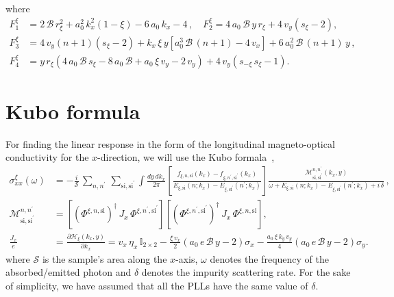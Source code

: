 \documentclass[aps,prb, onecolumn,nofootinbib,citeautoscript,10pt]{revtex4-2}
\def \nn{\nonumber \\}
\begin{document}
where
\begin{align}
F_1^\xi  &=  2 \, \mathcal{B}  \, r_\xi^2 + a_0^2 \,  k_x^2 \left (1 - \xi \right )
-6 \, a_0  \, k_x - 4\,, \quad
F_2^\xi  = 4 \, a_0 \, \mathcal{B} \, y  \, r_\xi + 4 \, v_y\left (s_\xi-2 \right ), \nn
F_3^\xi  &= 4\,v_y \left (n+1 \right ) \left (s_\xi-2 \right ) 
+k_x  \,  \xi \,y \left[ a_0^3  \, \mathcal{B}\,(n+1)-4 \, v_x\right]
+6 \, a_0^2 \, \mathcal{B}\,(n+1)\,y\,, \nn
F_4^\xi  & = y\, r_\xi \left(4 \,a_0\,\mathcal{B}\,s_\xi-8\,a_0 \, \mathcal{B}
+ a_0 \,\xi\, v_y-2\, v_y \right)
+ 4\,v_y\left(s_{-\xi} \, s_\xi-1\right).
\end{align}

\section{Kubo formula}

For finding the linear response in the form of the longitudinal magneto-optical conductivity for the $x$-direction, we will use
the Kubo formala~\cite{ashby-carbotte},
\begin{align}
\label{eqkubo}
\sigma^\xi_{xx}(\omega) &= -\frac{i} {\mathcal S} \, \sum_{n,n^\prime} \, \sum_{\text{si},\text{si}^\prime}
\int \frac{dy\, dk_x}{2\pi} \left[ \frac{f_{\xi, n ,\text{si}} (k_x) - f_{\xi, n^\prime ,\text{si}^\prime}(k_x)} 
	{E_{\xi,\text{si}} (n; k_x) - E_{\xi, \text{si}^\prime}(n^\prime; k_x)} \right ] 
\frac{ \mathcal{M}^{n, n^\prime}_{\text{si}, \text{si}^\prime} (k_x, y)}
	{\omega + E_{\xi, \text{si}}(n;k_x) - E_{\xi, \text{si}^\prime} (n^\prime; k_x) + i \, \delta} \,,\nn
 \mathcal{M}^{n, n^\prime}_{\text{si}, \text{si}^\prime} & =  
\left [ \left(\Phi^{\xi, n, \text{si}}\right)^\dagger \,J_x \, \Phi^{\xi, n^\prime, \text{si}^\prime} \right ]
 \left [ \left(\Phi^{\xi, n^\prime, \text{si}^\prime }\right)^\dagger \,J_x \, \Phi^{\xi, n, \text{si}} \right ],
\nn \frac{J_x} {e} & =  \frac{\partial {\mathcal H}_{\xi} (k_x, y) }{\partial k_x} 
=  v_x \,\eta _x\, \mathbb{I}_{2\times 2}
-\frac{\xi \, v_x  } {2} \left(a_0 \,e \,{\mathcal B} \, y-2\right)  \sigma _x
-\frac{a_0\, \xi \, k_y \,v_y }{4}  \left(a_0\, e\, {\mathcal B} \, y-2\right) \sigma_y. 
\end{align}
where $\mathcal S $ is the sample's area along the $x$-axis, $\omega $ denotes the frequency of the absorbed/emitted photon and $\delta$ denotes the impurity scattering rate. For the sake of simplicity, we have assumed that all the PLLs have the same value of $\delta $.
\end{document}
